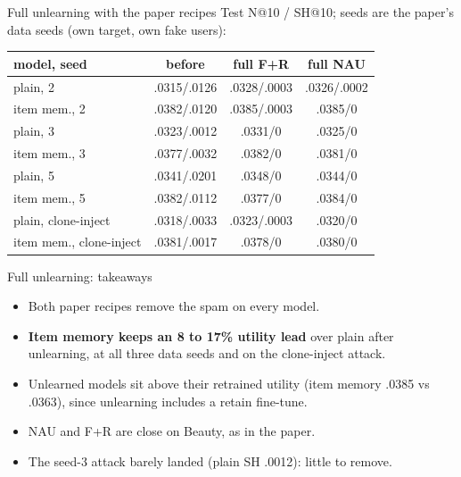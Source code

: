 \documentclass{beamer}
\begin{document}
\begin{frame}{Full unlearning with the paper recipes}
Test N@10 / SH@10; seeds are the paper's data seeds (own target, own fake users):
\begin{center}
\footnotesize\setlength{\tabcolsep}{4pt}
\begin{tabular}{|l|c|c|c|}
\hline
model, seed & before & full F+R & full NAU \\
\hline
plain, 2       & .0315/.0126 & .0328/.0003 & .0326/.0002 \\
item mem., 2   & .0382/.0120 & .0385/.0003 & .0385/0 \\
plain, 3       & .0323/.0012 & .0331/0 & .0325/0 \\
item mem., 3   & .0377/.0032 & .0382/0 & .0381/0 \\
plain, 5       & .0341/.0201 & .0348/0 & .0344/0 \\
item mem., 5   & .0382/.0112 & .0377/0 & .0384/0 \\
\hline
plain, clone-inject     & .0318/.0033 & .0323/.0003 & .0320/0 \\
item mem., clone-inject & .0381/.0017 & .0378/0 & .0380/0 \\
\hline
\end{tabular}
\end{center}
\end{frame}

\begin{frame}{Full unlearning: takeaways}
\begin{itemize}
  \item Both paper recipes remove the spam on every model.
  \item \textbf{Item memory keeps an 8 to 17\% utility lead} over plain after
        unlearning, at all three data seeds and on the clone-inject attack.
  \item Unlearned models sit above their retrained utility (item memory .0385
        vs .0363), since unlearning includes a retain fine-tune.
  \item NAU and F+R are close on Beauty, as in the paper.
  \item The seed-3 attack barely landed (plain SH .0012): little to remove.
\end{itemize}
\end{frame}
\end{document}

